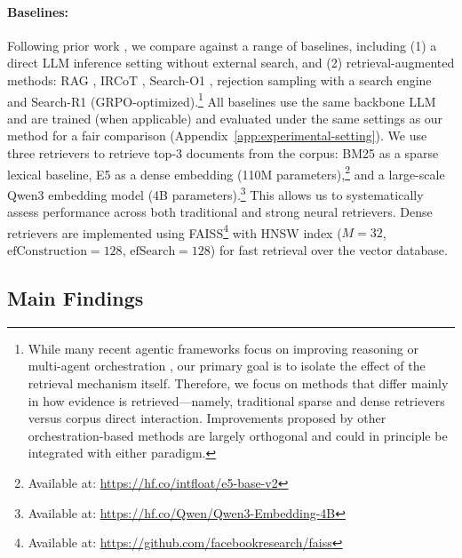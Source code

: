 \documentclass{llmxive}
\begin{document}
\paragraph{Baselines:}

Following prior work \citep{search-r1}, we compare against a range of baselines, including (1) a direct LLM inference setting without external search, and (2) retrieval-augmented methods: RAG \citep{rag}, IRCoT \citep{ircot}, Search-O1 \citep{search-o1}, rejection sampling with a search engine and Search-R1 \citep{search-r1} (GRPO-optimized).\footnote{While many recent agentic frameworks focus on improving reasoning\citep{jin2026beneficialreasoningbehaviorsagentic, sun-etal-2025-simpledeepsearcher} or multi-agent orchestration \citep{chen2026monolithicarchitecturesmultiagentsearch}, our primary goal is to isolate the effect of the retrieval mechanism itself. Therefore, we focus on methods that differ mainly in how evidence is retrieved---namely, traditional sparse and dense retrievers versus corpus direct interaction. Improvements proposed by other orchestration-based methods are largely orthogonal and could in principle be integrated with either paradigm.} All baselines use the same backbone LLM and are trained (when applicable) and evaluated under the same settings as our method for a fair comparison (Appendix~\ref{app:experimental-setting}). We use three retrievers to retrieve top-3 documents from the corpus: BM25 \citep{bm25} as a sparse lexical baseline, E5 \citep{e5} as a dense embedding (110M parameters),\footnote{Available at: \url{https://hf.co/intfloat/e5-base-v2}} and a large-scale Qwen3 embedding model \citep{qwen3embedding} (4B parameters).\footnote{Available at: \url{https://hf.co/Qwen/Qwen3-Embedding-4B}} This allows us to systematically assess performance across both traditional and strong neural retrievers. Dense retrievers are implemented using FAISS\footnote{Available at: \url{https://github.com/facebookresearch/faiss}} \citep{douze2025faisslibrary} with HNSW index \citep{hnsw} ($M=32$, $\text{efConstruction}=128$, $\text{efSearch}=128$) for fast retrieval over the vector database.



\subsection{Main Findings}
\end{document}
